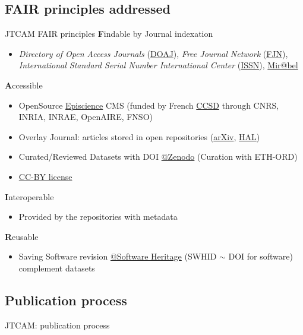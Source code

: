 \documentclass[10pt,compress,serif,aspectratio=169]{beamer}
\newcommand{\fig}[2]{\centering{\texttt{[image: \#2]}}}
\begin{document}
\subsection{FAIR principles addressed}
\begin{frame}[t]{JTCAM FAIR principles}
  \textbf{F}indable by Journal indexation
  \begin{itemize}
  \item \textit{Directory of Open Access Journals} (\href{https://doaj.org/}{DOAJ}), \textit{Free Journal Network} (\href{https://freejournals.org/}{FJN}), \textit{International Standard Serial Number International Center} (\href{https://www.issn.org/}{ISSN}), \href{https://reseau-mirabel.info/}{Mir@bel}
  \end{itemize}
\vfill
  \textbf{A}ccessible
  \begin{itemize}
  \item OpenSource \href{https://www.episciences.org/}{Episcience} CMS (funded by French \href{https://www.ccsd.cnrs.fr/}{CCSD} through CNRS, INRIA, INRAE, OpenAIRE, FNSO)  
  \item Overlay Journal: articles stored in open repositories (\href{https://arxiv.org/}{arXiv}, \href{https://hal.science/}{HAL})
  \item Curated/Reviewed Datasets with DOI \href{https://zenodo.org/}{@Zenodo} (Curation with ETH-ORD)
  \item \href{https://creativecommons.org/share-your-work/cclicenses/}{CC-BY license} 
  \end{itemize}
  \vfill
  \textbf{I}nteroperable
  \begin{itemize}
  \item Provided by the repositories with metadata
  \end{itemize}
\vfill
  \textbf{R}eusable
  \begin{itemize}
  \item Saving Software revision \href{https://www.softwareheritage.org/}{@Software Heritage} (SWHID $\sim$ DOI for software) complement datasets  
  \end{itemize}
 
\end{frame}
 

\subsection{Publication process}
\begin{frame}[t]{JTCAM: publication process}
 \begin{center}%
   \only<1>{\fig{1}{epirevue_0d}}%
   \only<2>{\fig{1}{epirevue_1d}}%
   \only<3>{\fig{1}{epirevue_2d}}%
    \only<4>{\fig{1}{epirevue_3d}}%
   \only<5>{\fig{1}{epirevue_4d}}%
   \only<6>{\fig{1}{epirevue_5d}}%
 \end{center}%
\end{frame}
 
\end{document}
